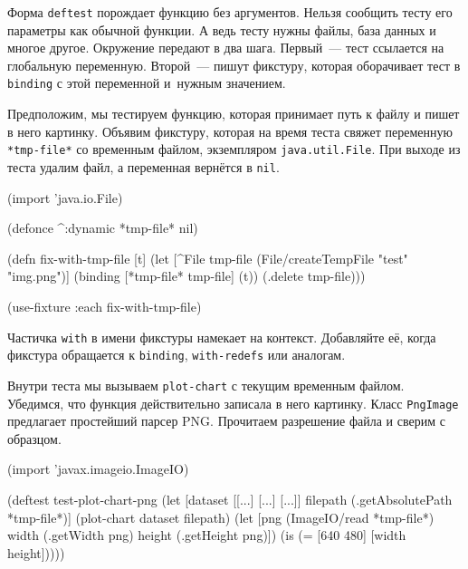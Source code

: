 Форма \verb|deftest| порождает функцию без аргументов. Нельзя сообщить тесту его
параметры как обычной функции. А ведь тесту нужны файлы, база данных и многое
другое. Окружение передают в два шага. Первый~--- тест ссылается на глобальную
переменную. Второй~--- пишут фикстуру, которая оборачивает тест в \verb|binding|
с этой переменной и~нужным значением.

Предположим, мы тестируем функцию, которая принимает путь к файлу и пишет в него
картинку. Объявим фикстуру, которая на время теста свяжет переменную
\verb|*tmp-file*| со временным файлом, экземпляром \verb|java.util.File|. При
выходе из теста удалим файл, а переменная вернётся в \verb|nil|.


\begin{english}
  \begin{clojure}
(import 'java.io.File)

(defonce ^:dynamic *tmp-file* nil)

(defn fix-with-tmp-file [t]
  (let [^File tmp-file (File/createTempFile "test" "img.png")]
    (binding [*tmp-file* tmp-file]
      (t))
    (.delete tmp-file)))

(use-fixture :each fix-with-tmp-file)
  \end{clojure}
\end{english}

Частичка \verb|with| в имени фикстуры намекает на контекст. Добавляйте её,
когда фикстура обращается к \verb|binding|, \verb|with-redefs| или аналогам.


Внутри теста мы вызываем \verb|plot-chart| с текущим временным
файлом. Убедимся, что функция действительно записала в него картинку. Класс
\verb|PngImage| предлагает простейший парсер PNG. Прочитаем разрешение файла и
сверим с образцом.

\begin{english}
  \begin{clojure}
(import 'javax.imageio.ImageIO)

(deftest test-plot-chart-png
  (let [dataset [[...] [...] [...]]
        filepath (.getAbsolutePath *tmp-file*)]
    (plot-chart dataset filepath)
    (let [png (ImageIO/read *tmp-file*)
          width (.getWidth png)
          height (.getHeight png)])
    (is (= [640 480] [width height]))))
  \end{clojure}
\end{english}


